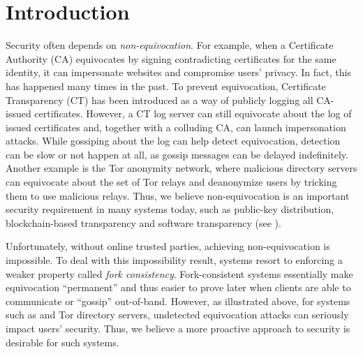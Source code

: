\section{Introduction}
Security often depends on \emph{non-equivocation}\cite{frientegrity,coniks}.
For example, when a Certificate Authority (CA) equivocates by signing contradicting certificates for the same identity, it can impersonate websites and compromise users' privacy.
In fact, this has happened many times in the past\cite{cahacksurvey,cafrance,cahacks,caturkey,etisalat,mitmgoogle,certifiedlies}.
To prevent equivocation, Certificate Transparency (CT)\cite{ct} has been introduced as a way of publicly logging all CA-issued certificates.
However, a CT log server can still equivocate about the log of issued certificates and, together with a colluding CA, can launch impersonation attacks.
While gossiping\cite{ctgossip} about the log can help detect equivocation, detection can be slow or not happen at all, as gossip messages can be delayed indefinitely.
Another example is the Tor\cite{tor} anonymity network, where malicious directory servers can equivocate about the set of Tor relays and deanonymize users by tricking them to use malicious relays\cite{tortransparency}.
Thus, we believe non-equivocation is an important security requirement in many systems today, such as public-key distribution, blockchain-based transparency\cite{keybase,blockstack} and software transparency (see ).

Unfortunately, without online trusted parties, achieving non\hyp{}equivocation is impossible\cite{sundrosdi}.
To deal with this impossibility result, systems resort to enforcing a weaker property called \emph{fork consistency}\cite{sundrosdi}.
Fork-consistent systems essentially make equivocation ``permanent'' and thus easier to prove later when clients are able to communicate or ``gossip'' out-of-band.
However, as illustrated above, for systems such as \pkds and Tor directory servers, undetected equivocation attacks can seriously impact users' security.
Thus, we believe a more proactive approach\cite{cosi} to security is desirable for such systems.

